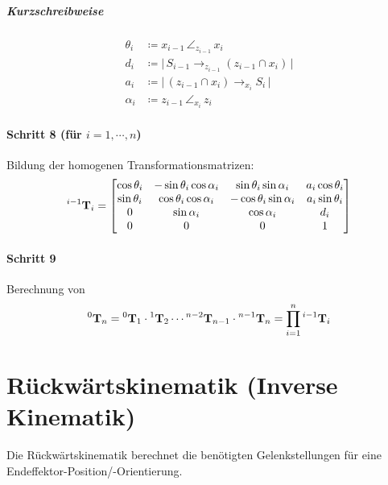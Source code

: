 					\subparagraph{Kurzschreibweise}
					\begin{align*}
						\theta_i & \coloneqq x_{i - 1} \,\angle_{z_{i - 1}}\, x_i                                     \\
						d_i      & \coloneqq \big\lvert\, S_{i - 1} \to_{z_{i - 1}} (z_{i - 1} \cap x_i) \,\big\rvert \\
						a_i      & \coloneqq \big\lvert\, (z_{i - 1} \cap x_i) \to_{x_i} S_i \,\big\rvert                   \\
						\alpha_i & \coloneqq z_{i - 1} \,\angle_{x_i}\, z_i
					\end{align*}
				
				\paragraph{Schritt 8 (für \( i = 1, \cdots, n \))}
					Bildung der homogenen Transformationsmatrizen:
					\begin{equation*}
						\prescript{i - 1}{}{\boldsymbol{\mathrm{T}}}_i =
							\begin{bmatrix}
								\cos\theta_i & -\sin\theta_i \cos\alpha_i & \sin\theta_i \sin\alpha_i  & a_i \cos\theta_i \\
								\sin\theta_i & \cos\theta_i \cos\alpha_i  & -\cos\theta_i \sin\alpha_i & a_i \sin\theta_i \\
								0            & \sin\alpha_i               & \cos\alpha_i               & d_i              \\
								0            & 0                          & 0                          & 1
							\end{bmatrix}
					\end{equation*}
				
				\paragraph{Schritt 9}
					Berechnung von
					\begin{equation*}
						\prescript{0}{}{\boldsymbol{\mathrm{T}}}_n = \prescript{0}{}{\boldsymbol{\mathrm{T}}}_1 \cdot \prescript{1}{}{\boldsymbol{\mathrm{T}}}_2 \cdots \prescript{n - 2}{}{\boldsymbol{\mathrm{T}}}_{n - 1} \cdot \prescript{n - 1}{}{\boldsymbol{\mathrm{T}}}_{n} = \prod_{i = 1}^{n} \prescript{i - 1}{}{\boldsymbol{\mathrm{T}}}_i
					\end{equation*}

	\section{Rückwärtskinematik (Inverse Kinematik)}
		Die Rückwärtskinematik \INVKIN berechnet die benötigten Gelenkstellungen für eine Endeffektor-Position/-Orientierung.
		
